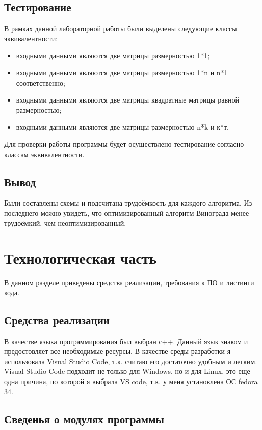 \documentclass[12pt,a4paper]{report}
\begin{document}
\section{Тестирование}

В рамках данной лабораторной работы были выделены следующие классы эквивалентности:
\begin{itemize}
	\item входными данными являются две матрицы размерностью 1*1;
	\item входными данными являются две матрицы размерностью 1*n и n*1 соответственно;
	\item входными данными являются две матрицы квадратные матрицы равной размерностью;
	\item входными данными являются две матрицы размерностью n*k и к*т.
\end{itemize}

Для проверки работы программы будет осуществлено тестирование согласно классам эквивалентности.

\section*{Вывод}
       
Были составлены схемы и подсчитана трудоёмкость для каждого алгоритма.
Из последнего можно увидеть, что оптимизированный алгоритм Винограда менее трудоёмкий, чем неоптимизированный.     


\newpage
\chapter{Технологическая часть} 

В данном разделе приведены средства реализации, требования к ПО и листинги кода.

\section{Средства реализации}
В качестве языка программирования был выбран с++. Данный язык знаком и предостовляет все необходимые ресурсы.
В качестве среды разработки я использовала Visual Studio Code, т.к. считаю его достаточно удобным и легким.
Visual Studio Code подходит не только для  Windows, но и для Linux, это еще одна причина, по которой я выбрала VS code, т.к. у меня установлена ОС  fedora 34.

\section{Сведенья о модулях программы}
\end{document}
